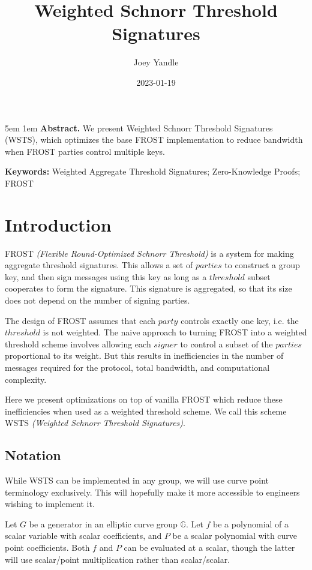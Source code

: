 \documentclass{article}
\title{Weighted Schnorr Threshold Signatures}
\date{2023-01-19}
\author{Joey Yandle}
\begin{document}
\onecolumn
\maketitle

\begingroup
\leftskip5em
\parskip1em
\rightskip\leftskip
\noindent\textbf{Abstract.} We present Weighted Schnorr Threshold Signatures (WSTS), which optimizes the base FROST implementation to reduce bandwidth when FROST parties control multiple keys.

\par
\noindent\textbf{Keywords:} Weighted Aggregate Threshold Signatures; Zero-Knowledge Proofs; FROST
\par
\endgroup

\section{
  Introduction
}

FROST \emph{(Flexible Round-Optimized Schnorr Threshold)} \cite{frost} is a system for making aggregate threshold signatures.  This allows a set of $parties$ to construct a group key, and then sign messages using this key as long as a $threshold$ subset cooperates to form the signature.  This signature is aggregated, so that its size does not depend on the number of signing parties.

The design of FROST assumes that each $party$ controls exactly one key, i.e. the $threshold$ is not weighted.  The naive approach to turning FROST into a weighted threshold scheme involves allowing each $signer$ to control a subset of the $parties$ proportional to its weight.  But this results in inefficiencies in the number of messages required for the protocol, total bandwidth, and computational complexity.

Here we present optimizations on top of vanilla FROST which reduce these inefficiencies when used as a weighted threshold scheme.  We call this scheme WSTS \emph{(Weighted Schnorr Threshold Signatures)}.

\subsection{
  Notation
}

While WSTS can be implemented in any group, we will use curve point terminology exclusively.  This will hopefully make it more accessible to engineers wishing to implement it.

Let $G$ be a generator in an elliptic curve group $\mathbb{G}$.  Let $f$ be a polynomial of a scalar variable with scalar coefficients, and $P$ be a scalar polynomial with curve point coefficients.  Both $f$ and $P$ can be evaluated at a scalar, though the latter will use scalar/point multiplication rather than scalar/scalar.
\end{document}
